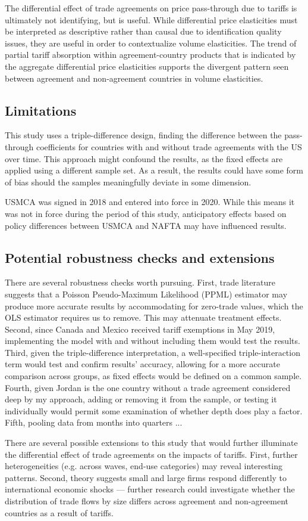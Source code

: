 The differential effect of trade agreements on price pass-through due to tariffs is ultimately not identifying, but is useful. While differential price elasticities must be interpreted as descriptive rather than causal due to identification quality issues, they are useful in order to contextualize volume elasticities. The trend of partial tariff absorption within agreement-country products that is indicated by the aggregate differential price elasticities supports the divergent pattern seen between agreement and non-agreement countries in volume elasticities. 

\subsection{Limitations}

This study uses a triple-difference design, finding the difference between the pass-through coefficients for countries with and without trade agreements with the US over time. This approach might confound the results, as the fixed effects are applied using a different sample set. As a result, the results could have some form of bias should the samples meaningfully deviate in some dimension. 

USMCA was signed in 2018 and entered into force in 2020. While this means it was not in force during the period of this study, anticipatory effects based on policy differences between USMCA and NAFTA may have influenced results. 

\subsection{Potential robustness checks and extensions}

There are several robustness checks worth pursuing. First, trade literature suggests that a Poisson Pseudo-Maximum Likelihood (PPML) estimator may produce more accurate results by accommodating for zero-trade values, which the OLS estimator requires us to remove. This may attenuate treatment effects. Second, since Canada and Mexico received tariff exemptions in May 2019, implementing the model with and without including them would test the results. Third, given the triple-difference interpretation, a well-specified triple-interaction term would test and confirm results' accuracy, allowing for a more accurate comparison across groups, as fixed effects would be defined on a common sample. Fourth, given Jordan is the one country without a trade agreement considered deep by my approach, adding or removing it from the sample, or testing it individually would permit some examination of whether depth does play a factor. Fifth, pooling data from months into quarters ...

There are several possible extensions to this study that would further illuminate the differential effect of trade agreements on the impacts of tariffs. First, further heterogeneities (e.g. across waves, end-use categories) may reveal interesting patterns. Second, theory suggests small and large firms respond differently to international economic shocks --- further research could investigate whether the distribution of trade flows by size differs across agreement and non-agreement countries as a result of tariffs.  